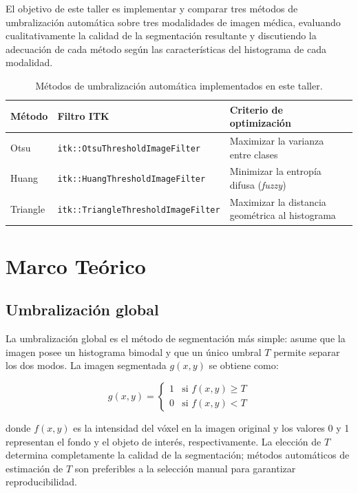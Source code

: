 \documentclass[12pt, a4paper]{article}
\begin{document}
El objetivo de este taller es implementar y comparar tres métodos de umbralización
automática sobre tres modalidades de imagen médica, evaluando cualitativamente la calidad
de la segmentación resultante y discutiendo la adecuación de cada método según las
características del histograma de cada modalidad.

\begin{table}[H]
\centering
\renewcommand{\arraystretch}{1.3}
\begin{tabularx}{\textwidth}{llX}
\toprule
\textbf{Método} & \textbf{Filtro ITK} & \textbf{Criterio de optimización} \\
\midrule
Otsu   & \texttt{itk::OtsuThresholdImageFilter}     & Maximizar la varianza entre clases \\
Huang  & \texttt{itk::HuangThresholdImageFilter}    & Minimizar la entropía difusa (\textit{fuzzy}) \\
Triangle & \texttt{itk::TriangleThresholdImageFilter} & Maximizar la distancia geométrica al histograma \\
\bottomrule
\end{tabularx}
\caption{Métodos de umbralización automática implementados en este taller.}
\end{table}

\section{Marco Teórico}

\subsection{Umbralización global}

La umbralización global es el método de segmentación más simple: asume que la imagen
posee un histograma bimodal y que un único umbral $T$ permite separar los dos modos.
La imagen segmentada $g(x,y)$ se obtiene como:

\begin{equation}
  g(x,y) =
  \begin{cases}
    1 & \text{si } f(x,y) \geq T \\
    0 & \text{si } f(x,y) < T
  \end{cases}
  \label{eq:threshold}
\end{equation}

donde $f(x,y)$ es la intensidad del vóxel en la imagen original y los valores 0 y 1
representan el fondo y el objeto de interés, respectivamente. La elección de $T$ determina
completamente la calidad de la segmentación; métodos automáticos de estimación de $T$ son
preferibles a la selección manual para garantizar reproducibilidad.
\end{document}
